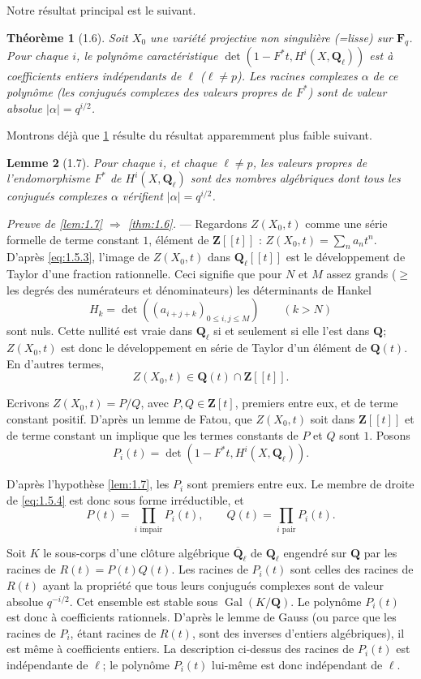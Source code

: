 \documentclass[12pt,a4paper]{amsart}
\theoremstyle{plain}
\newtheorem{theoreme}{Th\'eor\`eme}[section]
\newtheorem{lemme}[theoreme]{Lemme}
\theoremstyle{definition}
\theoremstyle{remark}
\DeclareMathOperator{\Gal}{Gal}
\newcommand{\Q}{\mathbf{Q}}
\newcommand{\Z}{\mathbf{Z}}
\newcommand{\F}{\mathbf{F}}
\numberwithin{equation}{section}
\begin{document}
Notre r\'esultat principal est le suivant.

\begin{theoreme}[1.6]\label{thm:1.6}
Soit $X_0$ une vari\'et\'e projective non singuli\`ere (=lisse) sur $\F_q$. Pour chaque $i$, le polyn\^ome caract\'eristique $\det(1-F^*t, H^i(X,\Q_\ell))$ est \`a coefficients entiers ind\'ependants de $\ell$ ($\ell\not=p$). Les racines complexes $\alpha$ de ce polyn\^ome (les conjugu\'es complexes des valeurs propres de $F^*$) sont de valeur absolue $|\alpha|=q^{i/2}$.
\end{theoreme}

Montrons d\'ej\`a que \ref{thm:1.6} r\'esulte du r\'esultat apparemment plus faible suivant.

\begin{lemme}[1.7]\label{lem:1.7}
Pour chaque $i$, et chaque $\ell\not=p$, les valeurs propres de l'endomorphisme $F^*$ de $H^i(X,\Q_\ell)$ sont des nombres alg\'ebriques dont tous les conjugu\'es complexes $\alpha$ v\'erifient $|\alpha|=q^{i/2}$.
\end{lemme}

\noindent \textit{Preuve de \eqref{lem:1.7} $\Rightarrow$ \eqref{thm:1.6}.} --- Regardons $Z(X_0,t)$ comme une s\'erie formelle de terme constant $1$, \'el\'ement de $\Z[[t]]$ : $Z(X_0,t)=\sum_n a_n t^n$. D'apr\`es \eqref{eq:1.5.3}, l'image de $Z(X_0,t)$ dans $\Q_\ell[[t]]$ est le d\'eveloppement de Taylor d'une fraction rationnelle. Ceci signifie que pour $N$ et $M$ assez grands ($\ge$ les degr\'es des num\'erateurs et d\'enominateurs) les d\'eterminants de Hankel
\[
H_k = \det((a_{i+j+k})_{0\le i,j\le M}) \qquad (k>N)
\]
sont nuls. Cette nullit\'e est vraie dans $\Q_\ell$ si et seulement si elle l'est dans $\Q$; $Z(X_0,t)$ est donc le d\'eveloppement en s\'erie de Taylor d'un \'el\'ement de $\Q(t)$. En d'autres termes,
\[
Z(X_0,t)\in\Q(t)\cap\Z[[t]].
\]

Ecrivons $Z(X_0,t)=P/Q$, avec $P,Q\in\Z[t]$, premiers entre eux, et de terme constant positif. D'apr\`es un lemme de Fatou, que $Z(X_0,t)$ soit dans $\Z[[t]]$ et de terme constant un implique que les termes constants de $P$ et $Q$ sont $1$. Posons
\[
P_i(t) = \det(1-F^*t, H^i(X,\Q_\ell)).
\]

D'apr\`es l'hypoth\`ese \eqref{lem:1.7}, les $P_i$ sont premiers entre eux. Le membre de droite de \eqref{eq:1.5.4} est donc sous forme irr\'eductible, et
\[
P(t) = \prod_{i\text{ impair}} P_i(t), \qquad Q(t) = \prod_{i\text{ pair}} P_i(t).
\]

Soit $K$ le sous-corps d'une cl\^oture alg\'ebrique $\overline{\Q}_\ell$ de $\Q_\ell$ engendr\'e sur $\Q$ par les racines de $R(t)=P(t)Q(t)$. Les racines de $P_i(t)$ sont celles des racines de $R(t)$ ayant la propri\'et\'e que tous leurs conjugu\'es complexes sont de valeur absolue $q^{-i/2}$. Cet ensemble est stable sous $\Gal(K/\Q)$. Le polyn\^ome $P_i(t)$ est donc \`a coefficients rationnels. D'apr\`es le lemme de Gauss (ou parce que les racines de $P_i$, \'etant racines de $R(t)$, sont des inverses d'entiers alg\'ebriques), il est m\^eme \`a coefficients entiers. La description ci-dessus des racines de $P_i(t)$ est ind\'ependante de $\ell$; le polyn\^ome $P_i(t)$ lui-m\^eme est donc ind\'ependant de $\ell$.
\end{document}
